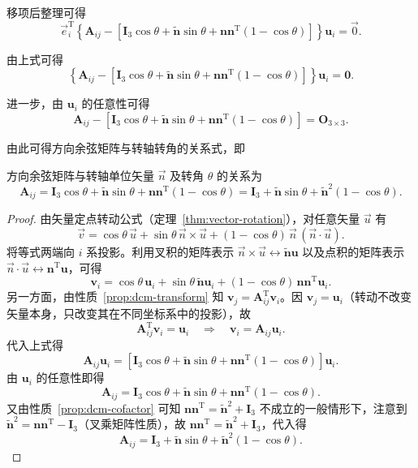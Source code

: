 移项后整理可得
$$
\vec{e}_i^{\mathrm{T}}\left\{\boldsymbol{A}_{ij}-\left[\boldsymbol{I}_3\cos\theta+\tilde{\boldsymbol{n}}\sin\theta+\boldsymbol{n}\boldsymbol{n}^{\mathrm{T}}(1-\cos\theta)\right]\right\}\boldsymbol{u}_i=\vec{0}.
$$

由上式可得
$$
\left\{\boldsymbol{A}_{ij}-\left[\boldsymbol{I}_3\cos\theta+\tilde{\boldsymbol{n}}\sin\theta+\boldsymbol{n}\boldsymbol{n}^{\mathrm{T}}(1-\cos\theta)\right]\right\}\boldsymbol{u}_i=\boldsymbol{0}.
$$

进一步，由 $\boldsymbol{u}_i$ 的任意性可得
$$
\boldsymbol{A}_{ij}-\left[\boldsymbol{I}_3\cos\theta+\tilde{\boldsymbol{n}}\sin\theta+\boldsymbol{n}\boldsymbol{n}^{\mathrm{T}}(1-\cos\theta)\right]=\boldsymbol{O}_{3\times3}.
$$

由此可得方向余弦矩阵与转轴转角的关系式，即

\begin{theorem}[罗德里格斯旋转公式]\label{thm:rodrigues}
	方向余弦矩阵与转轴单位矢量 $\vec{n}$ 及转角 $\theta$ 的关系为
	$$
	\boldsymbol{A}_{ij}=\boldsymbol{I}_3\cos\theta+\tilde{\boldsymbol{n}}\sin\theta+\boldsymbol{n}\boldsymbol{n}^{\mathrm{T}}(1-\cos\theta)=\boldsymbol{I}_3+\tilde{\boldsymbol{n}}\sin\theta+\tilde{\boldsymbol{n}}^2(1-\cos\theta).
	$$
\end{theorem}

\begin{proof}
	由矢量定点转动公式（定理~\ref{thm:vector-rotation}），对任意矢量 $\vec{u}$ 有
	$$
	\vec{v}=\cos\theta\,\vec{u}+\sin\theta\,\vec{n}\times\vec{u}+(1-\cos\theta)\,\vec{n}\,(\vec{n}\cdot\vec{u}).
	$$
	将等式两端向 $i$ 系投影。利用叉积的矩阵表示 $\vec{n}\times\vec{u}\leftrightarrow\tilde{\boldsymbol{n}}\boldsymbol{u}$ 以及点积的矩阵表示 $\vec{n}\cdot\vec{u}\leftrightarrow\boldsymbol{n}^{\mathrm{T}}\boldsymbol{u}$，可得
	$$
	\boldsymbol{v}_i=\cos\theta\,\boldsymbol{u}_i+\sin\theta\,\tilde{\boldsymbol{n}}\boldsymbol{u}_i+(1-\cos\theta)\,\boldsymbol{n}\boldsymbol{n}^{\mathrm{T}}\boldsymbol{u}_i.
	$$
	另一方面，由性质~\ref{prop:dcm-transform} 知 $\boldsymbol{v}_j=\boldsymbol{A}_{ij}^{\mathrm{T}}\boldsymbol{v}_i$。因 $\boldsymbol{v}_j=\boldsymbol{u}_i$（转动不改变矢量本身，只改变其在不同坐标系中的投影），故
	$$
	\boldsymbol{A}_{ij}^{\mathrm{T}}\boldsymbol{v}_i=\boldsymbol{u}_i \quad\Longrightarrow\quad \boldsymbol{v}_i=\boldsymbol{A}_{ij}\boldsymbol{u}_i.
	$$
	代入上式得
	$$
	\boldsymbol{A}_{ij}\boldsymbol{u}_i=\left[\boldsymbol{I}_3\cos\theta+\tilde{\boldsymbol{n}}\sin\theta+\boldsymbol{n}\boldsymbol{n}^{\mathrm{T}}(1-\cos\theta)\right]\boldsymbol{u}_i.
	$$
	由 $\boldsymbol{u}_i$ 的任意性即得
	$$
	\boldsymbol{A}_{ij}=\boldsymbol{I}_3\cos\theta+\tilde{\boldsymbol{n}}\sin\theta+\boldsymbol{n}\boldsymbol{n}^{\mathrm{T}}(1-\cos\theta).
	$$
	又由性质~\ref{prop:dcm-cofactor} 可知 $\boldsymbol{n}\boldsymbol{n}^{\mathrm{T}}=\tilde{\boldsymbol{n}}^2+\boldsymbol{I}_3$ 不成立的一般情形下，注意到 $\tilde{\boldsymbol{n}}^2=\boldsymbol{n}\boldsymbol{n}^{\mathrm{T}}-\boldsymbol{I}_3$（叉乘矩阵性质），故 $\boldsymbol{n}\boldsymbol{n}^{\mathrm{T}}=\tilde{\boldsymbol{n}}^2+\boldsymbol{I}_3$，代入得
	$$
	\boldsymbol{A}_{ij}=\boldsymbol{I}_3+\tilde{\boldsymbol{n}}\sin\theta+\tilde{\boldsymbol{n}}^2(1-\cos\theta).
	$$
\end{proof}

